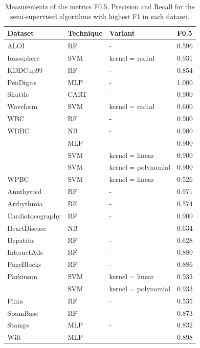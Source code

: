 \begin{table}[!ht]
	\centering
	\caption{Measurements of the metrics F0.5, Precision and Recall for the semi-supervised algorithms with highest F1 in each dataset.}
	\label{tab:best_algs_f05}
	\begin{tabular}{@{}llll@{}}
		\toprule
		\textbf{Dataset} & \textbf{Technique} & \textbf{Variant} & \textbf{F0.5} \\ \midrule
		ALOI & RF & - & 0.596 \\
		Ionosphere & SVM & kernel = radial & 0.931 \\
		KDDCup99 & RF & - & 0.854 \\
		PenDigits & MLP & - & 1.000 \\
		Shuttle & CART & - & 0.900 \\
		Waveform & SVM & kernel = radial & 0.600 \\
		WBC & RF & - & 0.900 \\
		WDBC & NB & - & 0.900 \\
		& MLP & - & 0.900 \\
		& SVM & kernel = linear & 0.900 \\
		& SVM & kernel = polynomial & 0.900 \\
		WPBC & SVM & kernel = linear & 0.526 \\
		Annthyroid & RF & - & 0.971 \\
		Arrhythmia & RF & - & 0.574 \\
		Cardiotocography & RF & - & 0.900 \\
		HeartDisease & NB & - & 0.634 \\
		Hepatitis & RF & - & 0.628 \\
		InternetAds & RF & - & 0.880 \\
		PageBlocks & RF & - & 0.886 \\
		Parkinson & SVM & kernel = linear & 0.933 \\
		& SVM & kernel = polynomial & 0.933 \\
		Pima & RF & - & 0.535 \\
		SpamBase & RF & - & 0.873 \\
		Stamps & MLP & - & 0.832 \\
		Wilt & MLP & - & 0.898 \\ \bottomrule
	\end{tabular}
\end{table}

